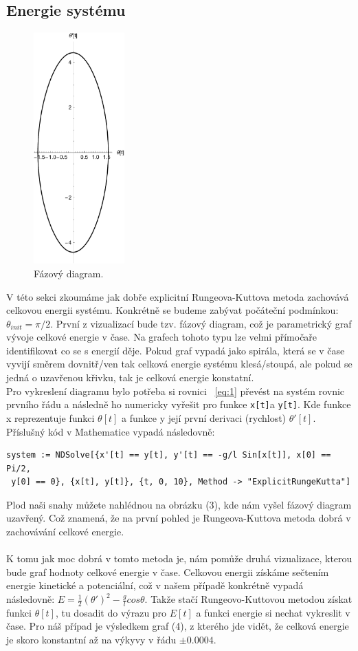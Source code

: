 \documentclass[reqno, a4paper]{amsart}
\begin{document}
\subsection{Energie systému}
\label{sec:sys-energy}
\begin{figure}
\includegraphics[width=3.5cm]{Runge - Kutta, Fazovy diagram}
\caption{Fázový diagram.}
\end{figure}
V této sekci zkoumáme jak dobře explicitní Rungeova-Kuttova metoda zachovává celkovou energii systému. Konkrétně se budeme zabývat počáteční podmínkou: $\theta_{init} = \pi /2$. První z vizualizací bude tzv. fázový diagram, což je parametrický graf vývoje celkové energie v čase. Na grafech tohoto typu lze velmi přímočaře identifikovat co se s energií děje. Pokud graf vypadá jako spirála, která se v čase vyvijí směrem dovnitř/ven tak celková energie systému klesá/stoupá, ale pokud se jedná o uzavřenou křivku, tak je celková energie konstatní.\\
Pro vykreslení diagramu bylo potřeba si rovnici ~\eqref{eq:1} převést na systém rovnic prvního řádu a následně ho numericky vyřešit pro funkce \verb|x[t]|a \verb|y[t]|. Kde funkce x reprezentuje funkci $\theta [t]$ a funkce y její první derivaci (rychlost) $\theta' [t]$. Příslušný kód v Mathematice vypadá následovně:
\begin{verbatim}
system := NDSolve[{x'[t] == y[t], y'[t] == -g/l Sin[x[t]], x[0] == Pi/2,
 y[0] == 0}, {x[t], y[t]}, {t, 0, 10}, Method -> "ExplicitRungeKutta"]
\end{verbatim}
Plod naši snahy můžete nahlédnou na obrázku (3), kde nám vyšel fázový diagram uzavřený. Což znamená, že na první pohled je Rungeova-Kuttova metoda dobrá v zachovávání celkové energie.\\ \\
K tomu jak moc dobrá v tomto metoda je, nám pomůže druhá vizualizace, kterou bude graf hodnoty celkové energie v čase. Celkovou energii získáme sečtením energie kinetické a potenciální, což v našem případě konkrétně vypadá následovně: $E = \frac{1}{2} (\theta')^2 - \frac{g}{l} cos \theta$. Takže stačí Rungeovo-Kuttovou metodou získat funkci $\theta[t]$, tu dosadit do výrazu pro $E[t]$ a funkci energie si nechat vykreslit v čase. Pro náš případ je výsledkem graf (4), z kterého jde vidět, že celková energie je skoro konstantní až na výkyvy v řádu $\pm 0.0004$.
\end{document}
